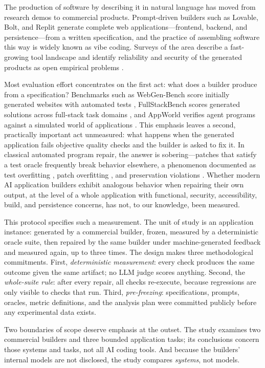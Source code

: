 The production of software by describing it in natural language has moved from
research demos to commercial products. Prompt-driven builders such as Lovable, Bolt,
and Replit generate complete web applications---frontend, backend, and
persistence---from a written specification, and the practice of assembling software
this way is widely known as vibe coding. Surveys of the area describe a fast-growing
tool landscape and identify reliability and security of the generated products as
open empirical problems \cite{ge2025vibe}.

Most evaluation effort concentrates on the first act: what does a builder produce
from a specification? Benchmarks such as WebGen-Bench score initially generated
websites with automated tests \cite{lu2025webgen}, FullStackBench scores generated
solutions across full-stack task domains \cite{byte2025fullstack}, and AppWorld
verifies agent programs against a simulated world of applications
\cite{trivedi2024appworld}. This emphasis leaves a second, practically important act
unmeasured: what happens when the generated application fails objective quality
checks and the builder is asked to fix it. In classical automated program repair,
the answer is sobering---patches that satisfy a test oracle frequently break behavior
elsewhere, a phenomenon documented as test overfitting \cite{smith2015cure},
patch overfitting \cite{petke2024patch}, and preservation violations
\cite{ismayilzada2023poracle}. Whether modern AI application builders exhibit
analogous behavior when repairing their own output, at the level of a whole
application with functional, security, accessibility, build, and persistence
concerns, has not, to our knowledge, been measured.

This protocol specifies such a measurement. The unit of study is an application
instance: generated by a commercial builder, frozen, measured by a deterministic
oracle suite, then repaired by the same builder under machine-generated feedback and
measured again, up to three times. The design makes three methodological commitments.
First, \emph{deterministic measurement}: every check produces the same outcome given
the same artifact; no LLM judge scores anything. Second, the \emph{whole-suite rule}:
after every repair, all checks re-execute, because regressions are only visible to
checks that run. Third, \emph{pre-freezing}: specifications, prompts, oracles,
metric definitions, and the analysis plan were committed publicly before any
experimental data exists.

Two boundaries of scope deserve emphasis at the outset. The study examines two
commercial builders and three bounded application tasks; its conclusions concern
those systems and tasks, not all AI coding tools. And because the builders' internal
models are not disclosed, the study compares \emph{systems}, not models.

